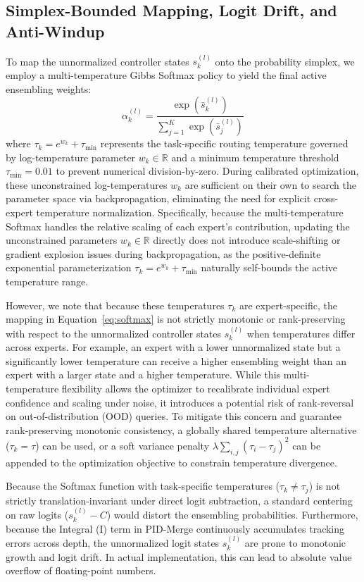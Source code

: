 \subsection{Simplex-Bounded Mapping, Logit Drift, and Anti-Windup}
To map the unnormalized controller states $s_k^{(l)}$ onto the probability simplex, we employ a multi-temperature Gibbs Softmax policy to yield the final active ensembling weights:
\begin{equation}
\alpha_k^{(l)} = \frac{\exp\left(\bar{s}_k^{(l)}\right)}{\sum_{j=1}^K \exp\left(\bar{s}_j^{(l)}\right)}
\label{eq:softmax}
\end{equation}
where $\tau_k = e^{w_k} + \tau_{\min}$ represents the task-specific routing temperature governed by log-temperature parameter $w_k \in \mathbb{R}$ and a minimum temperature threshold $\tau_{\min} = 0.01$ to prevent numerical division-by-zero. During calibrated optimization, these unconstrained log-temperatures $w_k$ are sufficient on their own to search the parameter space via backpropagation, eliminating the need for explicit cross-expert temperature normalization. Specifically, because the multi-temperature Softmax handles the relative scaling of each expert's contribution, updating the unconstrained parameters $w_k \in \mathbb{R}$ directly does not introduce scale-shifting or gradient explosion issues during backpropagation, as the positive-definite exponential parameterization $\tau_k = e^{w_k} + \tau_{\min}$ naturally self-bounds the active temperature range.

However, we note that because these temperatures $\tau_k$ are expert-specific, the mapping in Equation~\ref{eq:softmax} is not strictly monotonic or rank-preserving with respect to the unnormalized controller states $s_k^{(l)}$ when temperatures differ across experts. For example, an expert with a lower unnormalized state but a significantly lower temperature can receive a higher ensembling weight than an expert with a larger state and a higher temperature. While this multi-temperature flexibility allows the optimizer to recalibrate individual expert confidence and scaling under noise, it introduces a potential risk of rank-reversal on out-of-distribution (OOD) queries. To mitigate this concern and guarantee rank-preserving monotonic consistency, a globally shared temperature alternative ($\tau_k = \tau$) can be used, or a soft variance penalty $\lambda \sum_{i,j} (\tau_i - \tau_j)^2$ can be appended to the optimization objective to constrain temperature divergence.

Because the Softmax function with task-specific temperatures ($\tau_k \neq \tau_j$) is not strictly translation-invariant under direct logit subtraction, a standard centering on raw logits ($s_k^{(l)} - C$) would distort the ensembling probabilities. Furthermore, because the Integral (I) term in PID-Merge continuously accumulates tracking errors across depth, the unnormalized logit states $s_k^{(l)}$ are prone to monotonic growth and logit drift. In actual implementation, this can lead to absolute value overflow of floating-point numbers.

